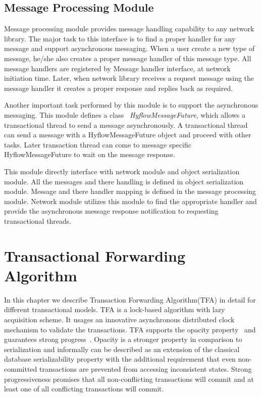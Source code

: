 \documentclass[12pt,english]{report}
\begin{document}
\section{Message Processing Module}

Message processing module provides message handling capability to any network library. The major task to this interface is to find a proper handler for any message and support asynchronous messaging. When a user create a new type of message, he/she also creates a proper message handler of this message type. All message handlers are registered by Message handler interface, at network initiation time. Later, when network library receives a request message using the message handler it creates a proper response and replies back as required.

Another important task performed by this module is to support the asynchronous messaging. This module defines a class ~\emph{HyflowMessageFuture}, which allows a transactional thread to send a message asynchronously. A transactional thread can send a message with a HyflowMessageFuture object and proceed with other tasks. Later transaction thread can come to message specific HyflowMessageFuture to wait on the message response. 

This module directly interface with network module and object serialization module. All the messages and there handling is defined in object serialization module. Message and there handler mapping is defined in the message processing module. Network module utilizes this module to find the appropriate handler and provide the asynchronous message response notification to requesting transactional threads.

\chapter{Transactional Forwarding Algorithm}\label{chap:algorithm}

In this chapter we describe Transaction Forwarding Algorithm(TFA) in detail for different transactional models. TFA is a lock-based algorithm with lazy acquisition scheme. It usages an innovative asynchronous distributed clock mechanism to validate the transactions. TFA supports the opacity property~\cite{guerraoui2009semantics} and guarantees  strong progress~\cite{guerraoui2009semantics}. Opacity is a stronger property in comparison to serialization and informally can be described as an extension of the classical database serializability property with the additional requirement that even non-committed transactions are prevented from accessing inconsistent states. Strong progressiveness promises that all non-conflicting transactions will commit and at least one of all conflicting transactions will commit.  
 
\end{document}
